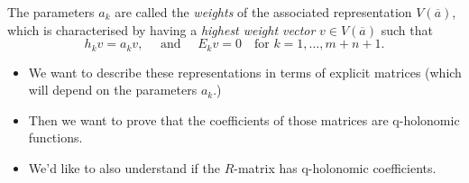 \documentclass[a4paper]{article}
\begin{document}
The parameters $a_k$ are called the \emph{weights} of the associated representation $V(\overline{a})$, which is characterised by having a \emph{highest weight vector} $v \in V(\overline{a})$ such that
\begin{equation}
    h_k v = a_k v, \quad\text{ and }\quad E_k v = 0  \quad\text{for } k = 1,\ldots,m+n+1.
\end{equation}
\begin{itemize}
  \item We want to describe these representations in terms of explicit matrices (which will depend on the parameters $a_k$.)
  \item Then we want to prove that the coefficients of those matrices are q-holonomic functions.
  \item We'd like to also understand if the $R$-matrix has q-holonomic coefficients.
\end{itemize}




\end{document}
